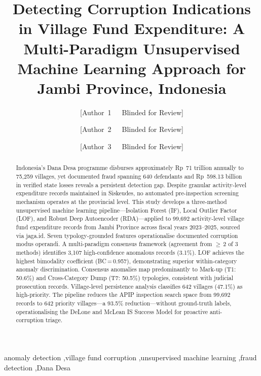 \documentclass[3p,times,procedia]{elsarticle}
\begin{document}
\begin{frontmatter}


\title{Detecting Corruption Indications in Village Fund Expenditure: A Multi-Paradigm Unsupervised Machine Learning Approach for Jambi Province, Indonesia}

\author[a]{[Author~1~~~Blinded for Review]}
\author[a]{[Author~2~~~Blinded for Review]}
\author[a]{[Author~3~~~Blinded for Review]}
\address[a]{[Affiliation~~~Blinded for Review]}

\begin{abstract}
Indonesia's Dana Desa programme disburses approximately Rp~71 trillion annually to 75,259 villages, yet documented fraud spanning 640 defendants and Rp~598.13 billion in verified state losses reveals a persistent detection gap. Despite granular activity-level expenditure records maintained in Siskeudes, no automated pre-inspection screening mechanism operates at the provincial level. This study develops a three-method unsupervised machine learning pipeline---Isolation Forest (IF), Local Outlier Factor (LOF), and Robust Deep Autoencoder (RDA)---applied to 99,692 activity-level village fund expenditure records from Jambi Province across fiscal years 2023--2025, sourced via jaga.id. Seven typology-grounded features operationalise documented corruption modus operandi. A multi-paradigm consensus framework (agreement from $\geq$\,2 of 3 methods) identifies 3,107 high-confidence anomalous records (3.1\%). LOF achieves the highest bimodality coefficient (BC\,=\,0.957), demonstrating superior within-category anomaly discrimination. Consensus anomalies map predominantly to Mark-up (T1: 50.6\%) and Cross-Category Dump (T7: 50.5\%) typologies, consistent with judicial prosecution records. Village-level persistence analysis classifies 642 villages (47.1\%) as high-priority. The pipeline reduces the APIP inspection search space from 99,692 records to 642 priority villages---a 93.5\% reduction---without ground-truth labels, operationalising the DeLone and McLean IS Success Model for proactive anti-corruption triage.
\end{abstract}

\begin{keyword}
anomaly detection \sep village fund corruption \sep unsupervised machine learning \sep fraud detection \sep Dana Desa
\end{keyword}

\end{frontmatter}
\end{document}
